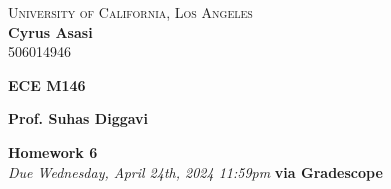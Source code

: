 \documentclass[letterpaper]{article}
\author{Hecate}
\date{\today}
\title{}
\theoremstyle{definition}
\begin{document}
\begin{center}
    \large\textsc{University of California, Los Angeles} \\
    \large\textbf{Cyrus Asasi} \\
    \large\textsc{506014946}
        
    \begin{minipage}[t]{0.5\textwidth}
        \raggedright
        \textbf{ECE M146}
    \end{minipage}%
    \begin{minipage}[t]{0.5\textwidth}
        \raggedleft
        \textbf{Prof. Suhas Diggavi}
    \end{minipage}
    \centering
    \large\textbf{Homework 6} \\
    \large\textit{Due Wednesday, April 24th, 2024 11:59pm} \textbf{via Gradescope}
\end{center}
\vspace{0.5cm}
\end{document}
